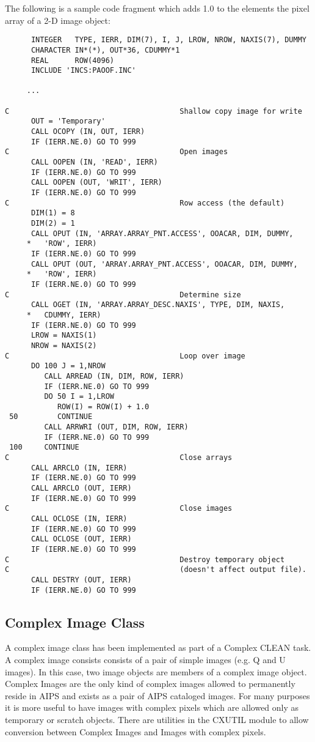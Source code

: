    The following is a sample code fragment which adds 1.0 to the
elements the pixel array of a 2-D image object:
{\small\begin{verbatim}
      INTEGER   TYPE, IERR, DIM(7), I, J, LROW, NROW, NAXIS(7), DUMMY
      CHARACTER IN*(*), OUT*36, CDUMMY*1
      REAL      ROW(4096)
      INCLUDE 'INCS:PAOOF.INC'

     ...

C                                       Shallow copy image for write
      OUT = 'Temporary'
      CALL OCOPY (IN, OUT, IERR)
      IF (IERR.NE.0) GO TO 999
C                                       Open images
      CALL OOPEN (IN, 'READ', IERR)
      IF (IERR.NE.0) GO TO 999
      CALL OOPEN (OUT, 'WRIT', IERR)
      IF (IERR.NE.0) GO TO 999
C                                       Row access (the default)
      DIM(1) = 8
      DIM(2) = 1
      CALL OPUT (IN, 'ARRAY.ARRAY_PNT.ACCESS', OOACAR, DIM, DUMMY,
     *   'ROW', IERR)
      IF (IERR.NE.0) GO TO 999
      CALL OPUT (OUT, 'ARRAY.ARRAY_PNT.ACCESS', OOACAR, DIM, DUMMY,
     *   'ROW', IERR)
      IF (IERR.NE.0) GO TO 999
C                                       Determine size
      CALL OGET (IN, 'ARRAY.ARRAY_DESC.NAXIS', TYPE, DIM, NAXIS,
     *   CDUMMY, IERR)
      IF (IERR.NE.0) GO TO 999
      LROW = NAXIS(1)
      NROW = NAXIS(2)
C                                       Loop over image
      DO 100 J = 1,NROW
         CALL ARREAD (IN, DIM, ROW, IERR)
         IF (IERR.NE.0) GO TO 999
         DO 50 I = 1,LROW
            ROW(I) = ROW(I) + 1.0
 50         CONTINUE
         CALL ARRWRI (OUT, DIM, ROW, IERR)
         IF (IERR.NE.0) GO TO 999
 100     CONTINUE
C                                       Close arrays
      CALL ARRCLO (IN, IERR)
      IF (IERR.NE.0) GO TO 999
      CALL ARRCLO (OUT, IERR)
      IF (IERR.NE.0) GO TO 999
C                                       Close images
      CALL OCLOSE (IN, IERR)
      IF (IERR.NE.0) GO TO 999
      CALL OCLOSE (OUT, IERR)
      IF (IERR.NE.0) GO TO 999
C                                       Destroy temporary object
C                                       (doesn't affect output file).
      CALL DESTRY (OUT, IERR)
      IF (IERR.NE.0) GO TO 999
\end{verbatim}}


\subsection{Complex Image Class}
   A complex image class has been implemented as part of a
Complex CLEAN task.  A complex image consists
consists of a pair of simple images (e.g. Q and U images).  In this
case, two image objects are members of a complex image object.
Complex Images are the only kind of complex images allowed to
permanently reside in AIPS and exists as a pair of AIPS cataloged
images. For many purposes it is more useful to have images with
complex pixels which are allowed only as temporary or scratch objects.
There are utilities in the CXUTIL module to allow conversion between
Complex Images and Images with complex pixels.


